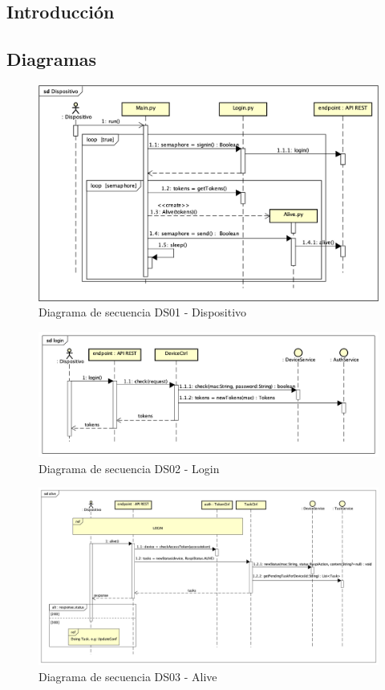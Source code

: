 

\subsection{Introducción}

\subsection{Diagramas}

\begin{figure}[H]
    \centering
    \includegraphics[width=12cm]{./img/sequence/diagram/device.png}
    \caption{Diagrama de secuencia DS01 - Dispositivo}
    \label{fig:seq.device}
\end{figure}

\begin{figure}[H]
    \centering
    \includegraphics[width=14cm]{./img/sequence/diagram/login.png}
    \caption{Diagrama de secuencia DS02 - Login}
    \label{fig:seq.login}
\end{figure}

\begin{figure}[H]
    \centering
    \includegraphics[width=14cm]{./img/sequence/diagram/alive.png}
    \caption{Diagrama de secuencia DS03 - Alive}
    \label{fig:seq.alive}
\end{figure}

